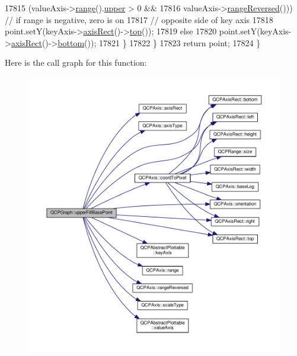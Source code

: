 \begin{DoxyCode}
17815           (valueAxis->\hyperlink{class_q_c_p_axis_ab1ea79a4f5ea4cf42620f8f51c477ac4}{range}().\hyperlink{class_q_c_p_range_ae44eb3aafe1d0e2ed34b499b6d2e074f}{upper} > 0 &&
17816            valueAxis->\hyperlink{class_q_c_p_axis_ade26dc7994ccd8a11f64fd83377ee021}{rangeReversed}())) \textcolor{comment}{// if range is negative, zero is on}
17817                                         \textcolor{comment}{// opposite side of key axis}
17818         point.setY(keyAxis->\hyperlink{class_q_c_p_axis_aada3102af43b029e3879bcbf2bddfabb}{axisRect}()->\hyperlink{class_q_c_p_axis_rect_ac45aef1eb75cea46b241b6303028a607}{top}());
17819       \textcolor{keywordflow}{else}
17820         point.setY(keyAxis->\hyperlink{class_q_c_p_axis_aada3102af43b029e3879bcbf2bddfabb}{axisRect}()->\hyperlink{class_q_c_p_axis_rect_af2b5982ebe7e6f781b9bf1cc371a60d8}{bottom}());
17821     \}
17822   \}
17823   \textcolor{keywordflow}{return} point;
17824 \}
\end{DoxyCode}


Here is the call graph for this function\+:\nopagebreak
\begin{figure}[H]
\begin{center}
\leavevmode
\includegraphics[width=350pt]{class_q_c_p_graph_a363d066c179e0f46cc93c12bafb0bfba_cgraph}
\end{center}
\end{figure}




